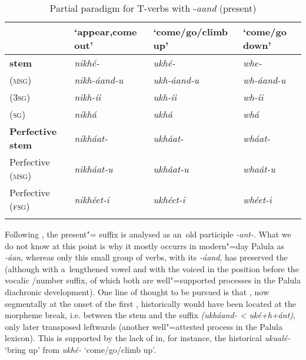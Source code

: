 \begin{table}[h]
\caption{Partial paradigm for T-verbs with -\textit{aand} (present)}
\begin{tabularx}{\textwidth}{ l Q Q Q }
\lsptoprule
&
`appear,\newline come out' &
`come/go/\newline climb up' &
`come/go down'\\\midrule
\textbf{ stem} &
\textit{nikhé- } &
\textit{ukhé-} &
\textit{whe-} \\
 (\textsc{msg}) &
\textit{nikh-áand-u} &
\textit{ukh-áand-u} &
\textit{wh-áand-u} \\
 (\textsc{3sg}) &
\textit{nikh-íi} &
\textit{ukh-íi} &
\textit{wh-íi} \\
 (\textsc{sg}) &
\textit{nikhá} &
\textit{ukhá} &
\textit{whá} \\
\textbf{Perfective stem} &
\textit{nikháat-} &
\textit{ukháat-} &
\textit{wháat-} \\
Perfective (\textsc{msg}) &
\textit{nikháat-u} &
\textit{ukháat-u} &
\textit{whaát-u} \\
Perfective (\textsc{fsg}) &
\textit{nikhéet-i} &
\textit{ukhéet-i} &
\textit{whéet-i} \\\lspbottomrule
\end{tabularx}
\label{tab:8-10}
\end{table}


Following \citet[22]{morgenstierne1941}, the present"= suffix is analysed as an~old participle \textit{-ant-}. What we do not know at this point is why it mostly occurrs in modern"=day Palula as \textit{-áan}, whereas only this small group of verbs, with its \textit{-áand}, has preserved the  (although with a~lengthened vowel and with the  voiced in the position before the vocalic /number suffix, of which both are well"=supported processes in the Palula diachronic development). One line of thought to be pursued is that , now segmentally at the onset of the first , historically would have been located at the morpheme break, i.e. between the stem and the  suffix \textit{(ukháand- {\textless} uké+h+ánt)}, only later transposed leftwards (another well"=attested process in the Palula lexicon). This is supported by the lack of  in, for instance, the historical  \textit{ukualé-} `bring up' from \textit{ukhé-} `come/go/climb up'.


